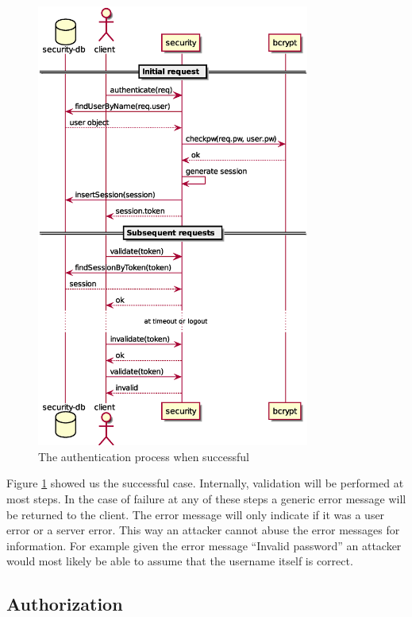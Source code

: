 \begin{figure}
    \begin{center}
    \includegraphics[width=0.8\textwidth]{package_manager/auth_sequence.eps}
    \end{center}
    \caption{The authentication process when successful}
    \label{fig:auth_process}
\end{figure}

Figure \ref{fig:auth_process} showed us the successful case. Internally,
validation will be performed at most steps. In the case of failure at
any of these steps a generic error message will be returned to the
client. The error message will only indicate if it was a user error or a
server error. This way an attacker cannot abuse the error messages for
information. For example given the error message ``Invalid password'' an
attacker would most likely be able to assume that the username itself is
correct.

\subsection{Authorization}
\label{sec:authorization}

